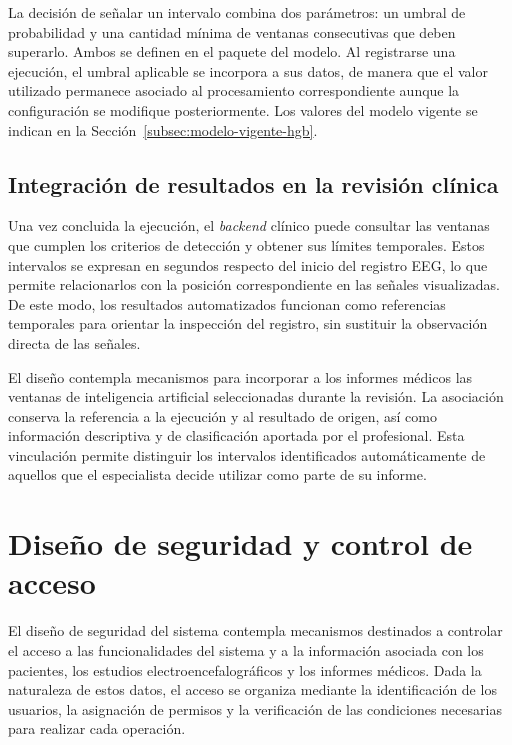 La decisión de señalar un intervalo combina dos parámetros: un umbral de probabilidad y una cantidad mínima de ventanas consecutivas que deben superarlo.
Ambos se definen en el paquete del modelo.
Al registrarse una ejecución, el umbral aplicable se incorpora a sus datos, de manera que el valor utilizado permanece asociado al procesamiento correspondiente aunque la configuración se modifique posteriormente.
Los valores del modelo vigente se indican en la Sección~\ref{subsec:modelo-vigente-hgb}.

\subsection{Integración de resultados en la revisión clínica}
\label{subsec:integracion-resultados-revision-clinica}

Una vez concluida la ejecución, el \textit{backend} clínico puede consultar las ventanas que cumplen los criterios de detección y obtener sus límites temporales. Estos intervalos se expresan en segundos respecto del inicio del registro EEG, lo que permite relacionarlos con la posición correspondiente en las señales visualizadas. De este modo, los resultados automatizados funcionan como referencias temporales para orientar la inspección del registro, sin sustituir la observación directa de las señales.

El diseño contempla mecanismos para incorporar a los informes médicos las ventanas de inteligencia artificial seleccionadas durante la revisión. La asociación conserva la referencia a la ejecución y al resultado de origen, así como información descriptiva y de clasificación aportada por el profesional. Esta vinculación permite distinguir los intervalos identificados automáticamente de aquellos que el especialista decide utilizar como parte de su informe.

\section{Diseño de seguridad y control de acceso}
\label{sec:seguridad-control-acceso}

El diseño de seguridad del sistema contempla mecanismos destinados a controlar el acceso a las funcionalidades del sistema y a la información asociada con los pacientes, los estudios electroencefalográficos y los informes médicos. Dada la naturaleza de estos datos, el acceso se organiza mediante la identificación de los usuarios, la asignación de permisos y la verificación de las condiciones necesarias para realizar cada operación.

